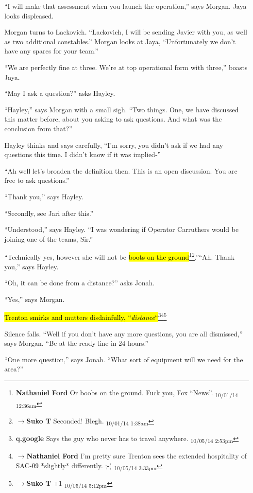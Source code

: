 ``I will make that assessment when you launch the operation,'' says Morgan.  Jaya looks displeased.

Morgan turns to Lackovich.  ``Lackovich, I will be sending Javier with you, as well as two additional constables.''  Morgan looks at Jaya, ``Unfortunately we don't have any spares for your team.''

``We are perfectly fine at three. We're at top operational form with three,'' boasts Jaya.

``May I ask a question?'' asks Hayley.

``Hayley,'' says Morgan with a small sigh.  ``Two things.  One, we have discussed this matter before, about you asking to ask questions.  And what was the conclusion from that?''

Hayley thinks and says carefully, ``I'm sorry, you didn't ask if we had any questions this time.  I didn't know if it was implied-''

``Ah well let's broaden the definition then. This is an open discussion.  You are free to ask questions.''

``Thank you,'' says Hayley.

``Secondly, see Jari after this.''

``Understood,'' says Hayley.  ``I was wondering if Operator Carruthers would be joining one of the teams, Sir.''

``Technically yes, however she will not be \hl{boots on the ground}\footnote{\textbf{Nathaniel Ford }Or boobs on the ground. Fuck you, Fox ``News''. \textsubscript{10/01/14 12:36am}}\footnote{$\rightarrow$\textbf{Suko T }Seconded!  Blegh. \textsubscript{10/01/14 1:38am}}.''``Ah.  Thank you,'' says Hayley.

``Oh, it can be done from a distance?'' asks Jonah.

``Yes,'' says Morgan.  

\hl{Trenton smirks and mutters disdainfully, ``\textit{distance}``}\footnote{\textbf{q.google }Says the guy who never has to travel anywhere. \textsubscript{10/05/14 2:53pm}}\footnote{$\rightarrow$\textbf{Nathaniel Ford }I'm pretty sure Trenton sees the extended hospitality of SAC-09 *slightly* differently. ;-) \textsubscript{10/05/14 3:33pm}}\footnote{$\rightarrow$\textbf{Suko T }+1 \textsubscript{10/05/14 5:12pm}}

Silence falls.  ``Well if you don't have any more questions, you are all dismissed,'' says Morgan.  ``Be at the ready line in 24 hours.''

``One more question,'' says Jonah.  ``What sort of equipment will we need for the area?''

